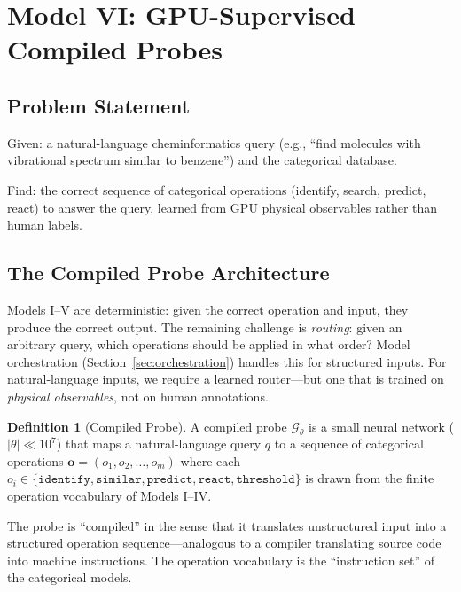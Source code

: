\documentclass[11pt,twocolumn,a4paper]{article}
\theoremstyle{definition}
\newtheorem{definition}[theorem]{Definition}
\theoremstyle{remark}
\begin{document}
\section{Model VI: GPU-Supervised Compiled Probes}
\label{sec:model6}

\subsection{Problem Statement}

Given: a natural-language cheminformatics query (e.g., ``find molecules with vibrational spectrum similar to benzene'') and the categorical database.

Find: the correct sequence of categorical operations (identify, search, predict, react) to answer the query, learned from GPU physical observables rather than human labels.

\subsection{The Compiled Probe Architecture}

Models I--V are deterministic: given the correct operation and input, they produce the correct output. The remaining challenge is \emph{routing}: given an arbitrary query, which operations should be applied in what order? Model orchestration (Section~\ref{sec:orchestration}) handles this for structured inputs. For natural-language inputs, we require a learned router---but one that is trained on \emph{physical observables}, not on human annotations.

\begin{definition}[Compiled Probe]
\label{def:compiled_probe}
A compiled probe $\mathcal{G}_\theta$ is a small neural network ($|\theta| \ll 10^7$) that maps a natural-language query $q$ to a sequence of categorical operations $\mathbf{o} = (o_1, o_2, \ldots, o_m)$ where each $o_i \in \{\texttt{identify}, \texttt{similar}, \texttt{predict}, \texttt{react}, \texttt{threshold}\}$ is drawn from the finite operation vocabulary of Models I--IV.
\end{definition}

The probe is ``compiled'' in the sense that it translates unstructured input into a structured operation sequence---analogous to a compiler translating source code into machine instructions. The operation vocabulary is the ``instruction set'' of the categorical models.
\end{document}
